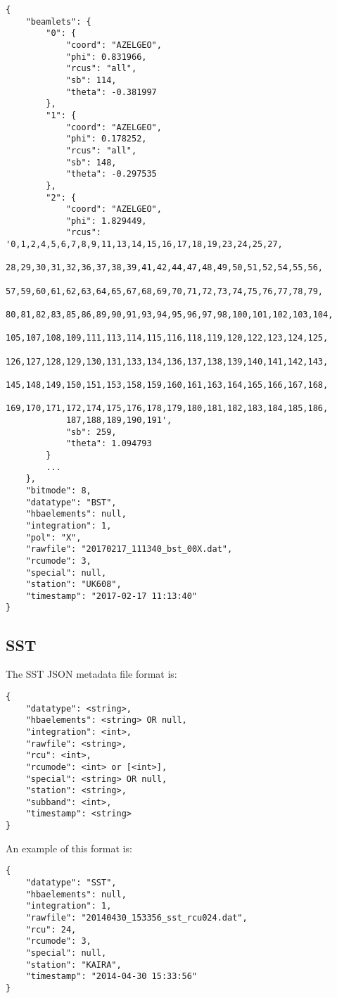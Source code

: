 \documentclass[10pt,a4paper]{article}
\begin{document}
\begin{verbatim}
{
    "beamlets": {
        "0": {
            "coord": "AZELGEO",
            "phi": 0.831966,
            "rcus": "all",
            "sb": 114,
            "theta": -0.381997
        },
        "1": {
            "coord": "AZELGEO",
            "phi": 0.178252,
            "rcus": "all",
            "sb": 148,
            "theta": -0.297535
        },
        "2": {
            "coord": "AZELGEO",
            "phi": 1.829449,
            "rcus": '0,1,2,4,5,6,7,8,9,11,13,14,15,16,17,18,19,23,24,25,27,
            28,29,30,31,32,36,37,38,39,41,42,44,47,48,49,50,51,52,54,55,56,
            57,59,60,61,62,63,64,65,67,68,69,70,71,72,73,74,75,76,77,78,79,
            80,81,82,83,85,86,89,90,91,93,94,95,96,97,98,100,101,102,103,104,
            105,107,108,109,111,113,114,115,116,118,119,120,122,123,124,125,
            126,127,128,129,130,131,133,134,136,137,138,139,140,141,142,143,
            145,148,149,150,151,153,158,159,160,161,163,164,165,166,167,168,
            169,170,171,172,174,175,176,178,179,180,181,182,183,184,185,186,
            187,188,189,190,191',
            "sb": 259,
            "theta": 1.094793
        }
		...
    },
    "bitmode": 8,
    "datatype": "BST",
    "hbaelements": null,
    "integration": 1,
    "pol": "X",
    "rawfile": "20170217_111340_bst_00X.dat",
    "rcumode": 3,
    "special": null,
    "station": "UK608",
    "timestamp": "2017-02-17 11:13:40"
}
\end{verbatim}

\subsection{SST}

The SST JSON metadata file format is:

\begin{verbatim}
{
    "datatype": <string>,
    "hbaelements": <string> OR null,
    "integration": <int>,
    "rawfile": <string>,
    "rcu": <int>,
    "rcumode": <int> or [<int>],
    "special": <string> OR null,
    "station": <string>,
    "subband": <int>,
    "timestamp": <string>
}
\end{verbatim}

\noindent An example of this format is:

\begin{verbatim}
{
    "datatype": "SST",
    "hbaelements": null,
    "integration": 1,
    "rawfile": "20140430_153356_sst_rcu024.dat",
    "rcu": 24,
    "rcumode": 3,
    "special": null,
    "station": "KAIRA",
    "timestamp": "2014-04-30 15:33:56"
}
\end{verbatim}
\end{document}
